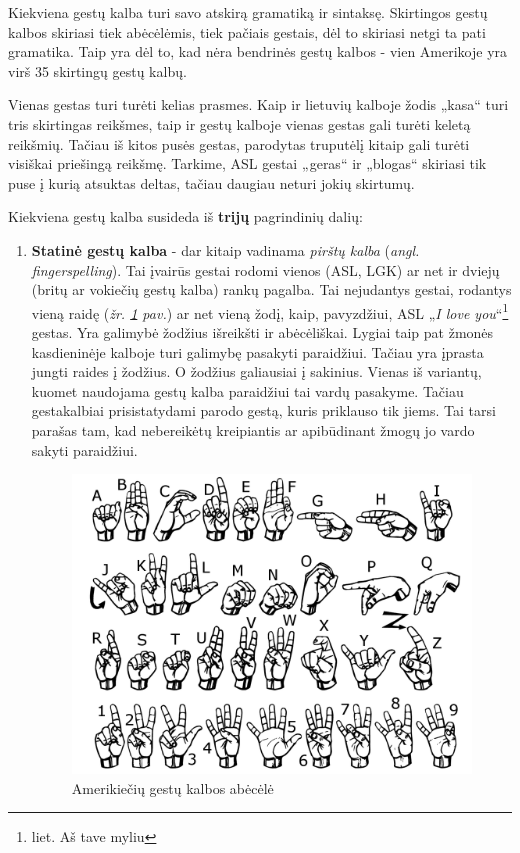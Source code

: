 \documentclass{VUMIFPSbakalaurinis}
\begin{document}
Kiekviena gestų kalba turi savo atskirą gramatiką ir sintaksę. Skirtingos gestų kalbos skiriasi tiek abėcėlėmis, tiek pačiais gestais, dėl to skiriasi netgi ta pati gramatika. Taip yra dėl to, kad nėra bendrinės gestų kalbos - vien Amerikoje yra virš 35 skirtingų gestų kalbų. 

Vienas gestas turi turėti kelias prasmes. Kaip ir lietuvių kalboje žodis „kasa“ turi tris skirtingas reikšmes, taip ir gestų kalboje vienas gestas gali turėti keletą reikšmių. Tačiau iš kitos pusės gestas, parodytas truputėlį kitaip gali turėti visiškai priešingą reikšmę. Tarkime, ASL gestai „geras“ ir „blogas“ skiriasi tik puse į kurią atsuktas deltas, tačiau daugiau neturi jokių skirtumų.

Kiekviena gestų kalba susideda iš \textbf{trijų} pagrindinių dalių:
\begin{enumerate}
	\item\textbf{Statinė gestų kalba} - dar kitaip vadinama \textit{pirštų kalba} (\textit{angl. fingerspelling}). Tai įvairūs gestai rodomi vienos (ASL, LGK) ar net ir dviejų (britų ar vokiečių gestų kalba) rankų pagalba. Tai nejudantys gestai, rodantys vieną raidę (\textit{žr. \ref{img:asl} pav.}) ar net vieną žodį, kaip, pavyzdžiui, ASL „\textit{I love you}“\footnote{liet. Aš tave myliu} gestas. Yra galimybė žodžius išreikšti ir abėcėliškai. Lygiai taip pat žmonės kasdieninėje kalboje turi galimybę pasakyti paraidžiui. Tačiau yra įprasta jungti raides į žodžius. O žodžius galiausiai į sakinius. Vienas iš variantų, kuomet naudojama gestų kalba paraidžiui tai vardų pasakyme. Tačiau gestakalbiai prisistatydami parodo gestą, kuris priklauso tik jiems. Tai tarsi parašas tam, kad nebereikėtų kreipiantis ar apibūdinant žmogų jo vardo sakyti paraidžiui.
	
\begin{figure}[H]
    \centering
    \includegraphics[scale=0.2]{img/ASL}
    \caption{Amerikiečių gestų kalbos abėcėlė}
    \label{img:asl}
\end{figure}


\end{enumerate}
\end{document}
